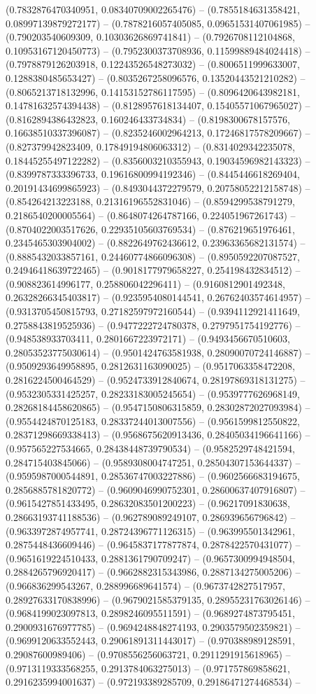 (0.7832876470340951, 0.08340709002265476) -- (0.7855184631358421, 0.08997139879272177) -- (0.7878216057405085, 0.09651531407061985) -- (0.790203540609309, 0.10303626869741841) -- (0.7926708112104868, 0.10953167120450773) -- (0.7952300373708936, 0.11599889484024418) -- (0.7978879126203918, 0.12243526548273032) -- (0.8006511999633007, 0.1288380485653427) -- (0.8035267258096576, 0.13520443521210282) -- (0.8065213718132996, 0.14153152786117595) -- (0.8096420643982181, 0.14781632574394438) -- (0.8128957618134407, 0.15405571067965027) -- (0.8162894386432823, 0.160246433734834) -- (0.8198300678157576, 0.16638510337396087) -- (0.8235246002964213, 0.17246817578209667) -- (0.827379942823409, 0.17849194806063312) -- (0.8314029342235078, 0.18445255497122282) -- (0.8356003210355943, 0.19034596982143323) -- (0.8399787333396733, 0.19616800994192346) -- (0.8445446618269404, 0.20191434699865923) -- (0.8493044372279579, 0.20758052212158748) -- (0.854264213223188, 0.21316196552831046) -- (0.8594299538791279, 0.2186540200005564) -- (0.8648074264787166, 0.224051967261743) -- (0.8704022003517626, 0.22935105603769534) -- (0.876219651976461, 0.2345465303904002) -- (0.8822649762436612, 0.23963365682131574) -- (0.8885432033857161, 0.24460774866096308) -- (0.8950592207087527, 0.24946418639722465) -- (0.9018177979658227, 0.254198432834512) -- (0.908823614996177, 0.258806042296411) -- (0.9160812901492348, 0.26328266345403817) -- (0.9235954080144541, 0.26762403574614957) -- (0.9313705450815793, 0.27182597972160544) -- (0.9394112921411649, 0.2758843819525936) -- (0.9477222724780378, 0.2797951754192776) -- (0.948538933703411, 0.2801667223972171) -- (0.9493456670510603, 0.28053523775030614) -- (0.9501424763581938, 0.28090070724146887) -- (0.9509293649958895, 0.2812631163090025) -- (0.9517063358472208, 0.2816224500464529) -- (0.9524733912840674, 0.28197869318131275) -- (0.9532305331425257, 0.28233183005245654) -- (0.9539777626968149, 0.28268184458620865) -- (0.9547150806315859, 0.28302872027093984) -- (0.9554424870125183, 0.28337244013007556) -- (0.9561599812550822, 0.28371298669338413) -- (0.9568675620913436, 0.28405034196641166) -- (0.957565227534665, 0.28438448739790534) -- (0.9582529748421594, 0.284715403845066) -- (0.9589308004747251, 0.28504307153644337) -- (0.9595987000544891, 0.28536747003227886) -- (0.9602566683194675, 0.2856885781820772) -- (0.9609046990752301, 0.28600637407916807) -- (0.9615427851433495, 0.28632083501200223) -- (0.96217091830638, 0.28663193741188536) -- (0.962789089249107, 0.286939656796842) -- (0.9633972874957741, 0.28724396771126315) -- (0.963995501342961, 0.2875448436609446) -- (0.9645837177877874, 0.2878422570431077) -- (0.9651619224510433, 0.2881361790709247) -- (0.9657300994948504, 0.2884265796920417) -- (0.9662882315343986, 0.2887134275005206) -- (0.966836299543267, 0.288996689641574) -- (0.9673742827517957, 0.28927633170838996) -- (0.9679021585379135, 0.28955231763026146) -- (0.9684199023097813, 0.2898246095511591) -- (0.9689274873795451, 0.2900931676977785) -- (0.9694248848274193, 0.2903579502359821) -- (0.9699120633552443, 0.29061891311443017) -- (0.970388989128591, 0.29087600989406) -- (0.9708556256063721, 0.2911291915618965) -- (0.9713119333568255, 0.2913784063275013) -- (0.971757869858621, 0.2916235994001637) -- (0.972193389285709, 0.29186471274468534) -- 